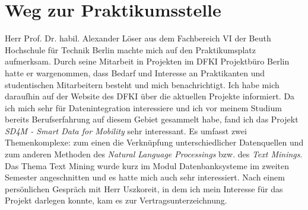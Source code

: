 \section{Weg zur Praktikumsstelle}
\label{sec:intro:wegZurPraktikumsstelle}
Herr Prof. Dr. habil. Alexander Löser aus dem Fachbereich VI der Beuth Hochschule für Technik Berlin machte mich auf den Praktikumsplatz aufmerksam. Durch seine Mitarbeit in Projekten im DFKI Projektbüro Berlin hatte er wargenommen, dass Bedarf und Interesse an Praktikanten und studentischen Mitarbeitern besteht und mich benachrichtigt.
Ich habe mich daraufhin auf der Website des DFKI über die aktuellen Projekte informiert.
Da ich mich sehr für Datenintegration interessiere und ich vor meinem Studium bereits Berufserfahrung auf diesem Gebiet gesammelt habe, fand ich das Projekt \textit{SD4M - Smart Data for Mobility} sehr interessant.
Es umfasst zwei Themenkomplexe: zum einen die Verknüpfung unterschiedlicher Datenquellen und zum anderen Methoden des \textit{Natural Language Processings} bzw. des \textit{Text Minings}.
Das Thema Text Mining wurde kurz im Modul Datenbanksysteme im zweiten Semester angeschnitten und es hatte mich auch sehr interessiert.
Nach einem persönlichen Gespräch mit Herr Uszkoreit, in dem ich mein Interesse für das Projekt darlegen konnte, kam es zur Vertragsunterzeichnung.